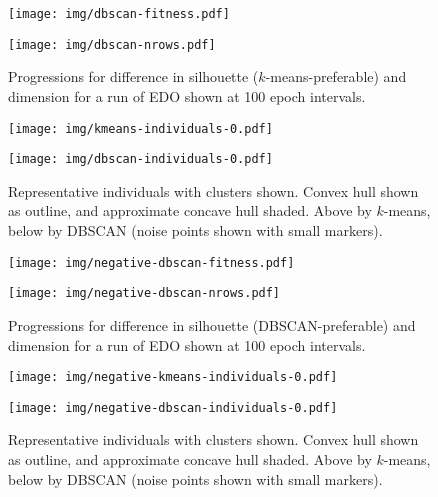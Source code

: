 \begin{figure}[htbp]
    \centering
    \begin{minipage}{\imgwidth}
        \centering
        \texttt{[image: img/dbscan-fitness.pdf]}
    \end{minipage}

    \begin{minipage}{\imgwidth}
        \centering
        \texttt{[image: img/dbscan-nrows.pdf]}
    \end{minipage}
    \caption{Progressions for difference in silhouette (\(k\)-means-preferable)
             and dimension for a run of EDO shown at 100 epoch
             intervals.}\label{figure:dbscan-silhouette}
\end{figure}

\begin{figure}[htbp]
    \centering
    \texttt{[image: img/kmeans-individuals-0.pdf]}

    \texttt{[image: img/dbscan-individuals-0.pdf]}
    \caption{Representative individuals with clusters shown. Convex hull shown
             as outline, and approximate concave hull shaded. Above by
             \(k\)-means, below by DBSCAN (noise points shown with small
             markers).}\label{figure:dbscan-individuals}
\end{figure}


\begin{figure}[htbp]
    \centering
    \begin{minipage}{\imgwidth}
        \centering
        \texttt{[image: img/negative-dbscan-fitness.pdf]}
    \end{minipage}

    \begin{minipage}{\imgwidth}
        \centering
        \texttt{[image: img/negative-dbscan-nrows.pdf]}
    \end{minipage}
    \caption{Progressions for difference in silhouette (DBSCAN-preferable) and
             dimension for a run of EDO shown at 100 epoch
             intervals.}\label{figure:negative-dbscan-silhouette}
\end{figure}

\begin{figure}[htbp]
    \centering
    \texttt{[image: img/negative-kmeans-individuals-0.pdf]}

    \texttt{[image: img/negative-dbscan-individuals-0.pdf]}
    \caption{Representative individuals with clusters shown. Convex hull shown
             as outline, and approximate concave hull shaded. Above by
             \(k\)-means, below by DBSCAN (noise points shown with small
             markers).}\label{figure:negative-dbscan-individuals}
\end{figure}
